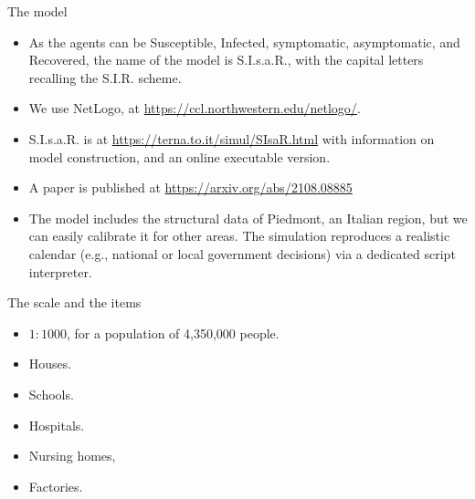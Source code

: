 \documentclass[9pt]{beamer}
\begin{document}
\begin{frame}{The model}

\begin{itemize}
 
 \item
As the agents can be Susceptible, Infected, symptomatic, asymptomatic, and Recovered, the name of the model is S.I.s.a.R., with the capital letters recalling the S.I.R. scheme.

\item 
We use NetLogo, at \url{https://ccl.northwestern.edu/netlogo/}.

\item
S.I.s.a.R. is at \url{https://terna.to.it/simul/SIsaR.html} with information on model construction, and an online executable version.

\item
 A paper is published at \url{https://arxiv.org/abs/2108.08885}

\item 
The model includes the structural data of Piedmont, an Italian region, but we can easily calibrate it for other areas. The simulation reproduces a realistic calendar (e.g., national or local government decisions) via a dedicated script interpreter.

\end{itemize}
\end{frame}

\begin{frame}{The scale and the items}

\begin{itemize}

\item $1:1000$, for a population of 4,350,000 people.

\bigskip

\item Houses.
\item Schools.
\item Hospitals.
\item Nursing homes,
\item Factories.

\end{itemize}

\end{frame}


\end{document}
